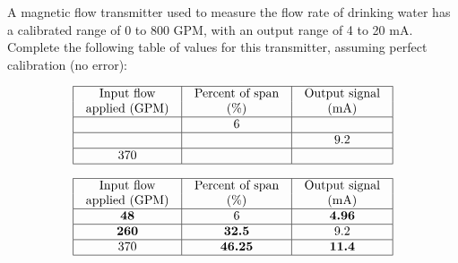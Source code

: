 

A magnetic flow transmitter used to measure the flow rate of drinking water has a calibrated range of 0 to 800 GPM, with an output range of 4 to 20 mA.  Complete the following table of values for this transmitter, assuming perfect calibration (no error):


$$\vbox{\offinterlineskip
\halign{\strut
\vrule \quad\hfil # \ \hfil & 
\vrule \quad\hfil # \ \hfil & 
\vrule \quad\hfil # \ \hfil \vrule \cr
\noalign{\hrule}
%
Input flow & Percent of span & Output signal \cr
%
applied (GPM) & (\%) & (mA) \cr
%
\noalign{\hrule}
%
 & 6 &  \cr
%
\noalign{\hrule}
%
 &  & 9.2 \cr
%
\noalign{\hrule}
%
370 &  &  \cr
%
\noalign{\hrule}
} %
}$$ %









$$\vbox{\offinterlineskip
\halign{\strut
\vrule \quad\hfil # \ \hfil & 
\vrule \quad\hfil # \ \hfil & 
\vrule \quad\hfil # \ \hfil \vrule \cr
\noalign{\hrule}
%
Input flow & Percent of span & Output signal \cr
%
applied (GPM) & (\%) & (mA) \cr
%
\noalign{\hrule}
%
{\bf 48} & 6 & {\bf 4.96} \cr
%
\noalign{\hrule}
%
{\bf 260} & {\bf 32.5} & 9.2 \cr
%
\noalign{\hrule}
%
370 & {\bf 46.25} & {\bf 11.4} \cr
%
\noalign{\hrule}
} %
}$$ %









